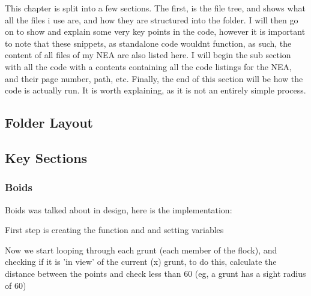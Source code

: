This chapter is split into a few sections. The first, is the file tree, and shows what all the files i use are, and how they are structured into the folder. I will then go on to show and explain some very key points in the code, however it is important to note that these snippets, as standalone code wouldnt function, as such, the content of all files of my NEA are also listed here. I will begin the sub section with all the code with a contents containing all the code listings for the NEA, and their page number, path, etc. Finally, the end of this section will be how the code is actually run. It is worth explaining, as it is not an entirely simple process.

\subsection{Folder Layout}

\subsection{Key Sections}
\subsubsection{Boids}
Boids was talked about in design, here is the implementation:

First step is creating the function and and setting variables


Now we start looping through each grunt (each member of the flock), and checking if it is 'in view' of the current (x) grunt, to do this, calculate the distance between the points and check less than 60 (eg, a grunt has a sight radius of 60) 


